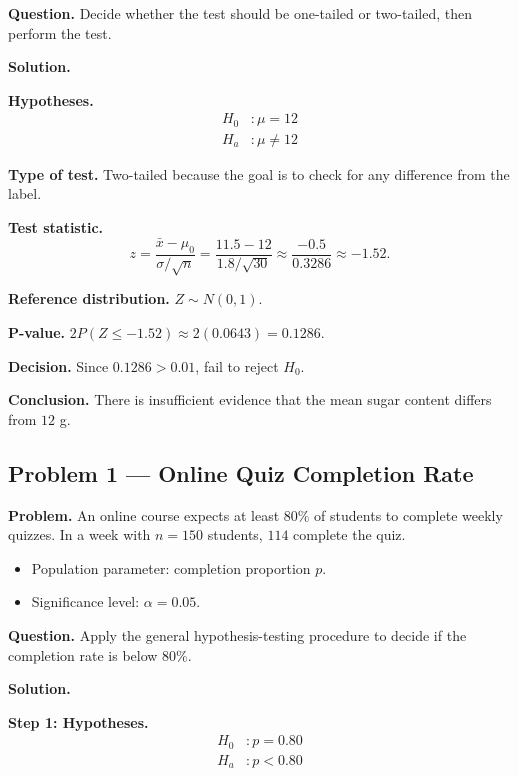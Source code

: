 	\textbf{Question.} Decide whether the test should be one-tailed or two-tailed, then perform the test.
	
	\textbf{Solution.}
	
	\textbf{Hypotheses.}
	\[
	\begin{aligned}
		H_0&: \mu = 12 \\
		H_a&: \mu \neq 12
	\end{aligned}
	\]
	
	\textbf{Type of test.} Two-tailed because the goal is to check for any difference from the label.
	
	\textbf{Test statistic.}
	\[
	z = \frac{\bar{x}-\mu_0}{\sigma/\sqrt{n}} = \frac{11.5-12}{1.8/\sqrt{30}} \approx \frac{-0.5}{0.3286} \approx -1.52.
	\]
	
	\textbf{Reference distribution.} $Z \sim N(0,1)$.
	
	\textbf{P-value.} $2P(Z\le -1.52)\approx 2(0.0643)=0.1286$.
	
	\textbf{Decision.} Since $0.1286>0.01$, fail to reject $H_0$.
	
	\textbf{Conclusion.} There is insufficient evidence that the mean sugar content differs from $12$ g.
	
	
	\hypertarget{c4-ex1}{}
	\subsection*{Problem 1 — Online Quiz Completion Rate}
	
	\textbf{Problem.} An online course expects at least $80\%$ of students to complete weekly quizzes. In a week with $n=150$ students, $114$ complete the quiz.
	\begin{itemize}
		\item Population parameter: completion proportion $p$.
		\item Significance level: $\alpha=0.05$.
	\end{itemize}
	
	\textbf{Question.} Apply the general hypothesis-testing procedure to decide if the completion rate is below $80\%$.
	
	\textbf{Solution.}
	
	\textbf{Step 1: Hypotheses.}
	\[
	\begin{aligned}
		H_0&: p = 0.80 \\
		H_a&: p < 0.80
	\end{aligned}
	\]
	

